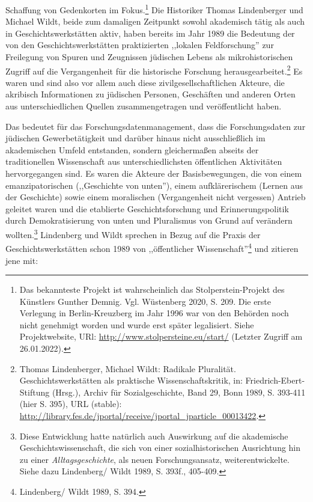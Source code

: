 Schaffung von Gedenkorten im Fokus.\footnote{Das bekannteste Projekt ist wahrscheinlich das Stolperstein-Projekt des Künstlers Gunther Demnig. Vgl. Wüstenberg 2020, S. 209. Die erste Verlegung in Berlin-Kreuzberg im Jahr 1996 war von den Behörden noch nicht genehmigt worden und wurde erst später legalisiert. Siehe Projektwebsite, URl: \url{http://www.stolpersteine.eu/start/} (Letzter Zugriff am 26.01.2022).} Die Historiker Thomas Lindenberger und Michael Wildt, beide zum damaligen Zeitpunkt sowohl akademisch tätig als auch in Geschichtswerkstätten aktiv, haben bereits im Jahr 1989 die Bedeutung der von den Geschichtswerkstätten praktizierten ,,lokalen Feldforschung'' zur Freilegung von Spuren und Zeugnissen jüdischen Lebens als mikrohistorischen Zugriff auf die Vergangenheit für die historische Forschung herausgearbeitet.\footnote{Thomas Lindenberger, Michael Wildt: Radikale Pluralität. Geschichtswerkstätten als praktische Wissenschaftskritik, in: Friedrich-Ebert-Stiftung (Hrsg.), Archiv für Sozialgeschichte, Band 29, Bonn 1989, S. 393-411 (hier S. 395), URL (stable): \url{http://library.fes.de/jportal/receive/jportal_jparticle_00013422}.} Es waren und sind also vor allem auch diese zivilgesellschaftlichen Akteure, die akribisch Informationen zu jüdischen Personen, Geschäften und anderen Orten aus unterschiedlichen Quellen zusammengetragen und veröffentlicht haben.

Das bedeutet für das Forschungsdatenmanagement, dass die Forschungsdaten zur jüdischen Gewerbetätigkeit und darüber hinaus nicht ausschließlich im akademischen Umfeld entstanden, sondern gleichermaßen abseits der traditionellen Wissenschaft aus unterschiedlichsten öffentlichen Aktivitäten hervorgegangen sind. Es waren die Akteure der Basisbewegungen, die von einem emanzipatorischen (,,Geschichte von unten''), einem aufklärerischem (Lernen aus der Geschichte) sowie einem moralischen (Vergangenheit nicht vergessen) Antrieb geleitet waren und die etablierte Geschichtsforschung und Erinnerungspolitik durch Demokratisierung von unten und Pluralismus von Grund auf verändern wollten.\footnote{Diese Entwicklung hatte natürlich auch Auswirkung auf die akademische Geschichtswissenschaft, die sich von einer sozialhistorischen Ausrichtung hin zu einer \textit{Alltagsgeschichte}, als neuen Forschungsansatz, weiterentwickelte. Siehe dazu Lindenberg/ Wildt 1989, S. 393f., 405-409.} Lindenberg und Wildt sprechen in Bezug auf die Praxis der Geschichtswerkstätten schon 1989 von ,,öffentlicher Wissenschaft''\footnote{Lindenberg/ Wildt 1989, S. 394.} und zitieren jene mit:


